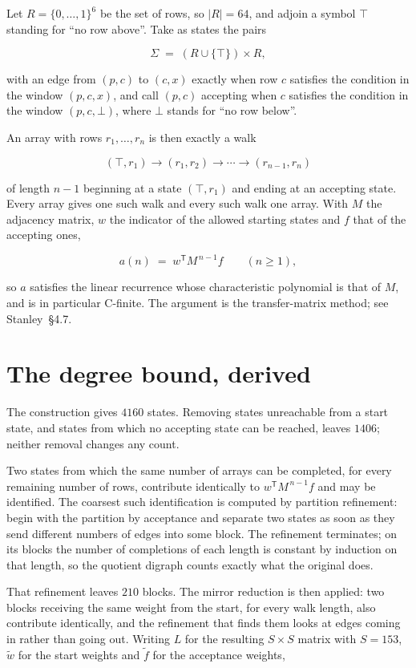 \documentclass[11pt]{article}
\theoremstyle{definition}
\begin{document}
Let $R = \{0,\dots,1\}^{6}$ be the set of rows, so $|R| = 64$, and adjoin a symbol $\top$ standing for ``no row above''. Take as states the pairs

\[\Sigma \;=\; (R \cup \{\top\}) \times R,\]

with an edge from $(p,c)$ to $(c,x)$ exactly when row $c$ satisfies the condition in the window $(p,c,x)$, and call $(p,c)$ accepting when $c$ satisfies the condition in the window $(p,c,\bot)$, where $\bot$ stands for ``no row below''.

An array with rows $r_1,\dots,r_n$ is then exactly a walk

\[(\top,r_1) \to (r_1,r_2) \to \cdots \to (r_{n-1},r_n)\]

of length $n-1$ beginning at a state $(\top,r_1)$ and ending at an accepting state. Every array gives one such walk and every such walk one array. With $M$ the adjacency matrix, $w$ the indicator of the allowed starting states and $f$ that of the accepting ones,

\[a(n) \;=\; w^{\mathsf T} M^{\,n-1} f \qquad (n \ge 1),\]

so $a$ satisfies the linear recurrence whose characteristic polynomial is that of $M$, and is in particular C-finite. The argument is the transfer-matrix method; see Stanley~\S4.7.

\section{The degree bound, derived}

The construction gives $4160$ states. Removing states unreachable from a start state, and states from which no accepting state can be reached, leaves $1406$; neither removal changes any count.

Two states from which the same number of arrays can be completed, for every remaining number of rows, contribute identically to $w^{\mathsf T}M^{\,n-1}f$ and may be identified. The coarsest such identification is computed by partition refinement: begin with the partition by acceptance and separate two states as soon as they send different numbers of edges into some block. The refinement terminates; on its blocks the number of completions of each length is constant by induction on that length, so the quotient digraph counts exactly what the original does.

That refinement leaves $210$ blocks. The mirror reduction is then applied: two blocks receiving the same weight from the start, for every walk length, also contribute identically, and the refinement that finds them looks at edges coming in rather than going out. Writing $L$ for the resulting $S \times S$ matrix with $S = 153$, $\tilde w$ for the start weights and $\tilde f$ for the acceptance weights,
\end{document}
